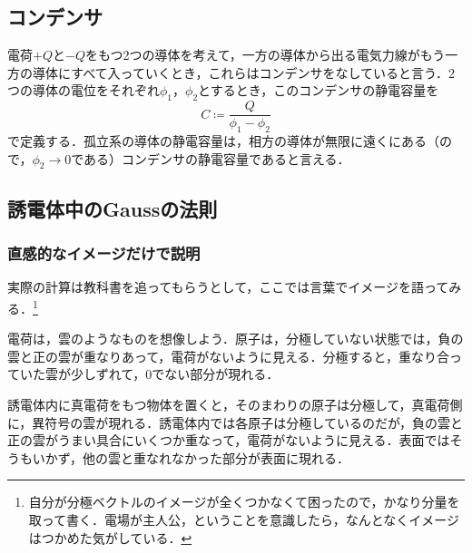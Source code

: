 \documentclass[a4paper,10pt,uplatex]{jsarticle}
\renewcommand{\P}{\vb*{P}}
\newcommand{\x}{\vb*{x}}
\newcommand{\n}{\vb*{n}}
\begin{document}
\subsection{コンデンサ}
電荷$+Q$と$-Q$をもつ2つの導体を考えて，一方の導体から出る電気力線がもう一方の導体にすべて入っていくとき，これらはコンデンサをなしていると言う．2つの導体の電位をそれぞれ$\phi_1$，$\phi_2$とするとき，このコンデンサの静電容量を
\begin{equation}
    C \coloneqq \frac{Q}{\phi_1 - \phi_2}
\end{equation}
で定義する．孤立系の導体の静電容量は，相方の導体が無限に遠くにある（ので，$\phi_2 \to 0$である）コンデンサの静電容量であると言える．

\subsection{誘電体中のGaussの法則}
\begin{comment}
    よくわかっていない．$S_1$，$S_2$を真電荷を囲む任意の曲面とする．曲面のとり方に依らず
    \begin{equation}
        \int_{S_1} \P(\x) \cdot \n(\x) \dd{S} = \int_{S_2} \P(\x) \cdot \n(\x) \dd{S}
    \end{equation}
    が成り立つのが納得いかない．これが成り立つとすると，分極電荷を$\rho_d(\x)$として，Gaussの定理より，
    \begin{equation}
        \int_{V_1} \rho_d(\x) \dd[3]{x} = \int_{V_2} \rho_d(\x) \dd[3]{x}
    \end{equation}
    となる．
\end{comment}

\subsubsection{直感的なイメージだけで説明}
実際の計算は教科書を追ってもらうとして，ここでは言葉でイメージを語ってみる．\footnote{自分が分極ベクトルのイメージが全くつかなくて困ったので，かなり分量を取って書く．電場が主人公，ということを意識したら，なんとなくイメージはつかめた気がしている．}

電荷は，雲のようなものを想像しよう．原子は，分極していない状態では，負の雲と正の雲が重なりあって，電荷がないように見える．分極すると，重なり合っていた雲が少しずれて，0でない部分が現れる．

誘電体内に真電荷をもつ物体を置くと，そのまわりの原子は分極して，真電荷側に，異符号の雲が現れる．誘電体内では各原子は分極しているのだが，負の雲と正の雲がうまい具合にいくつか重なって，電荷がないように見える．表面ではそうもいかず，他の雲と重なれなかった部分が表面に現れる．
\end{document}
